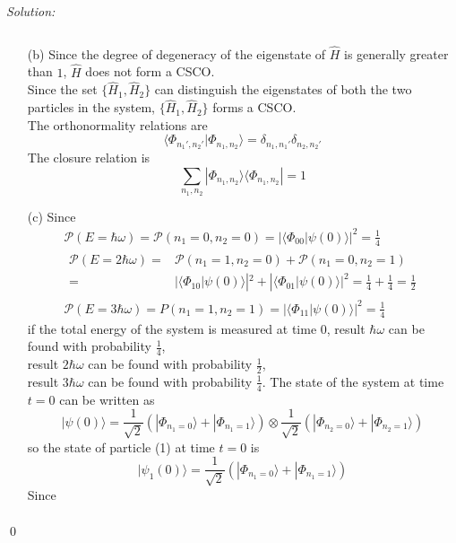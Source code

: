 \documentclass[12pt,a4paper]{article}
\newenvironment{sol}
    {\emph{Solution:}
    }
    {
    \qed
    }
\begin{document}
\begin{sol}
\begin{itemize}
\begin{equation}
\end{equation}
\item[(b)] Since the degree of degeneracy of the eigenstate of $\hat{H}$ is generally greater than $1$, $\hat{H}$ does not form a CSCO.\\
Since the set $\{\hat{H}_1,\hat{H}_2\}$ can distinguish the eigenstates of both the two particles in the system, $\{\hat{H}_1,\hat{H}_2\}$ forms a CSCO.\\
The orthonormality relations are
\begin{equation}
\langle\Phi_{n_1',n_2'}|\Phi_{n_1,n_2}\rangle=\delta_{n_1,n_1'}\delta_{n_2,n_2'}
\end{equation}
The closure relation is
\begin{equation}
\sum_{n_1,n_2}|\Phi_{n_1,n_2}\rangle\langle\Phi_{n_1,n_2}|=1
\end{equation}
\item[(c)] Since
\begin{gather}
\mathcal{P}(E=\hbar\omega)=\mathcal{P}(n_1=0,n_2=0)=|\langle\Phi_{00}|\psi(0)\rangle|^2=\frac{1}{4}\\
\begin{align}
\nonumber\mathcal{P}(E=2\hbar\omega)=&\mathcal{P}(n_1=1,n_2=0)+\mathcal{P}(n_1=0,n_2=1)\\
=&|\langle\Phi_{10}|\psi(0)\rangle|^2+|\langle\Phi_{01}|\psi(0)\rangle|^2=\frac{1}{4}+\frac{1}{4}=\frac{1}{2}
\end{align}\\
\mathcal{P}(E=3\hbar\omega)=P(n_1=1,n_2=1)=|\langle\Phi_{11}|\psi(0)\rangle|^2=\frac{1}{4}
\end{gather}
if the total energy of the system is measured at time $0$, result $\hbar\omega$ can be found with probability $\frac{1}{4}$,\\
result $2\hbar\omega$ can be found with probability $\frac{1}{2}$,\\
result $3\hbar\omega$ can be found with probability $\frac{1}{4}$.
The state of the system at time $t=0$ can be written as
\begin{equation}
|\psi(0)\rangle=\frac{1}{\sqrt{2}}(|\Phi_{n_1=0}\rangle+|\Phi_{n_1=1}\rangle)\otimes\frac{1}{\sqrt{2}}(|\Phi_{n_2=0}\rangle+|\Phi_{n_2=1}\rangle)
\end{equation}
so the state of particle (1) at time $t=0$ is
\begin{equation}
|\psi_1(0)\rangle=\frac{1}{\sqrt{2}}(|\Phi_{n_1=0}\rangle+|\Phi_{n_1=1}\rangle)
\end{equation}
Since
\begin{gather}

\end{gather}
\end{itemize}
\end{sol}
\end{document}
